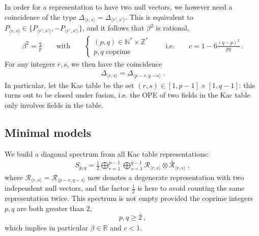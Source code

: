 \documentclass[12pt, a4paper]{article}
\theoremstyle{break}
\begin{document}
In order for a representation to have two null vectors, we however need a coincidence of 
the type $\Delta_{\langle r,s \rangle} = \Delta_{\langle r',s' \rangle}$. 
This is equivalent to $P_{\langle r,s \rangle} \in \{ P_{\langle r',s' \rangle}, -P_{\langle r',s' \rangle}\}$, and it follows that
$\beta^2$ is rational,
\begin{align} 
 \beta^2 =  \frac{q}{p} \qquad \text{with} \qquad \left\{\begin{array}{l} (p,q)\in \mathbb{N}^*\times \mathbb{Z}^* \\ p, q\text{ coprime} \end{array} \right. 
 \qquad \text{i.e.} \qquad c = 1-6\frac{(q-p)^2}{pq}\ .
 \label{eq:bcmin}
\end{align}
For any integers $r,s$, we then have the coincidence 
\begin{align}
 \Delta_{\langle r,s \rangle} = \Delta_{\langle p-r, q-s\rangle}\ .
\end{align}
In particular, let the Kac table be the set $(r,s)\in [1, p-1]\times [1,q-1]$: this turns out to be closed under fusion, i.e. the OPE of two fields in the Kac table only involves fields in the table. 

\subsection{Minimal models}

We build a diagonal spectrum from all Kac table representations:
\begin{align}
 S_{p, q} = \frac12 \bigoplus_{r=1}^{p-1} \bigoplus_{s=1}^{q-1} \mathcal{R}_{\langle r,s \rangle}\otimes \mathcal{\bar{R}}_{\langle r,s \rangle}\ ,
\end{align}
where  $\mathcal{R}_{\langle r,s \rangle}=\mathcal{R}_{\langle p-r,q-s \rangle}$ now denotes a degenerate representation with two independent null vectors, and the factor $\frac12$ is here to avoid counting the same representation twice.
This spectrum is not empty provided the coprime integers $p,q$ are both greater than $2$,
\begin{align}
 p,q \geq 2 \ ,
 \label{eq:pqmin}
\end{align}
which implies in particular $\beta\in \mathbb{R}$ and $c<1$. 
\end{document}

